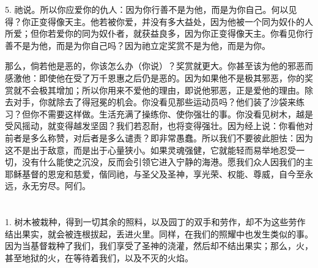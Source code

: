 5. 祂说。所以你应爱你的仇人：因为你行善不是为他，而是为你自己。何以见得？你正变得像天主。他若被你爱，并没有多大益处，因为他被一个同为奴仆的人所爱；但你若爱你的同为奴仆者，就获益良多，因为你正变得像天主。你看见你行善不是为他，而是为你自己吗？因为祂立定奖赏不是为他，而是为你。\par

那么，倘若他是恶的，你该怎么办（你说）？奖赏就更大。你甚至该为他的邪恶而感激他：即使他在受了万千恩惠之后仍是恶的。因为如果他不是极其邪恶，你的奖赏就不会极其增加；所以你用来不爱他的理由，即说他邪恶，正是爱他的理由。除去对手，你就除去了得冠冕的机会。你没看见那些运动员吗？他们装了沙袋来练习？但你不需要这样做。生活充满了操练你、使你强壮的事。你没看见树木，越是受风摇动，就变得越发坚固？我们若忍耐，也将变得强壮。因为经上说：你看他对前者是多么称赞，对后者是多么谴责？即非常愚蠢。所以我们不要彼此胆怯：因为这不是出于敌意，而是出于心量狭小。如果灵魂强健，它就能轻而易举地忍受一切，没有什么能使之沉没，反而会引领它进入宁静的海港。愿我们众人因我们的主耶稣基督的恩宠和慈爱，偕同祂，与圣父及圣神，享光荣、权能、尊威，自今至永远，永无穷尽。阿们。\par



\section{}


\subsection{}

\par

1. 树木被栽种，得到一切其余的照料，以及园丁的双手和劳作，却不为这些劳作结出果实，就会被连根拔起，丢进火里。同样，在我们的照耀中也发生类似的事。因为当基督栽种了我们，我们享受了圣神的浇灌，然后却不结出果实；那么，火，甚至地狱的火，在等待着我们，以及不灭的火焰。\par

